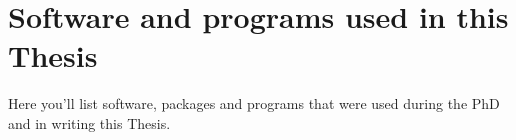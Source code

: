 
\chapter{Software and programs used in this Thesis} %

\label{AppendixA} %

Here you'll list  software, packages and programs that were used during the PhD and in writing this Thesis.
